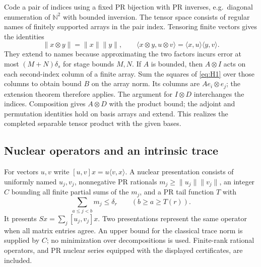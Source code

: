 Code a pair of indices using a fixed PR bijection with PR inverses, e.g.\
diagonal enumeration of $\mathbb N^2$ with bounded inversion. The tensor
space consists of regular names of finitely supported arrays in the pair
index. Tensoring finite vectors gives the identities
\[
 \|x\otimes y\|=\|x\|\|y\|,\qquad
 \langle x\otimes y,u\otimes v\rangle
   =\langle x,u\rangle\langle y,v\rangle .
\]
They extend to names because approximating the two factors incurs error
at most $(M+N)\delta_s$ for stage bounds $M,N$. If $A$ is bounded, then
$A\otimes I$ acts on each second-index column of a finite array. Sum the
squares of \eqref{eq:H1} over those columns to obtain bound $B$ on the
array norm. Its columns are $Ae_i\otimes e_j$; the extension theorem
therefore applies. The argument for $I\otimes D$ interchanges the indices.
Composition gives $A\otimes D$ with the product bound; the adjoint and
permutation identities hold on basis arrays and extend. This realizes the
completed separable tensor product with the given bases.

\subsection{Nuclear operators and an intrinsic trace}

For vectors $u,v$ write $[u,v]x=u\langle v,x\rangle$. A nuclear
presentation consists of uniformly named $u_j,v_j$, nonnegative PR
rationals $m_j\ge\|u_j\|\|v_j\|$, an integer $C$ bounding all finite
partial sums of the $m_j$, and a PR tail function $T$ with
\[
  \sum_{a\le j<b}m_j\le\delta_r\qquad(b\ge a\ge T(r)).
 \tag{H2}\label{eq:H2}
\]
It presents $Sx=\sum_j[u_j,v_j]x$. Two presentations represent the same
operator when all matrix entries agree. An upper bound for the classical
trace norm is supplied by $C$; no minimization over decompositions is used.
Finite-rank rational operators, and PR nuclear series equipped with the
displayed certificates, are included.

